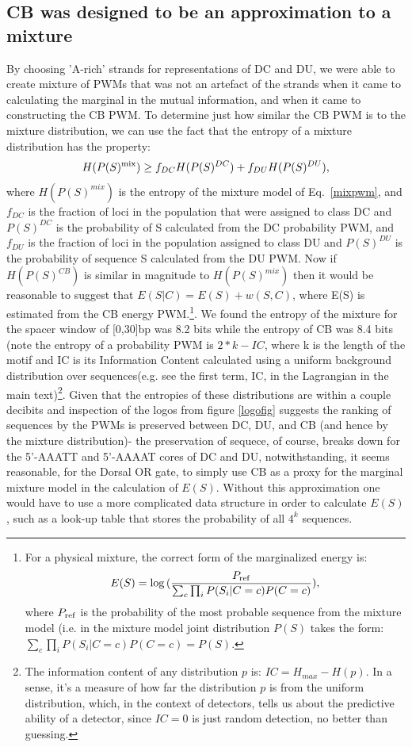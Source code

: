  \subsection{CB was designed to be an approximation to a mixture}\label{just}
By choosing 'A-rich' strands for representations of DC and DU, we were able to create mixture of PWMs that was not an artefact of the strands when it came to calculating the marginal in the mutual information, and when it came to constructing the CB PWM.  To determine just how similar the CB PWM is to the mixture distribution, we can use the fact that the entropy of a mixture distribution has the property:
\begin{equation}
H(P(S)^{\rm mix}) \geq f_{DC} H(P(S)^{DC}) + f_{DU} H(P(S)^{DU}),
\end{equation}
where $H( P(S)^{mix})$ is the entropy of the mixture model of Eq.~\ref{mixpwm}, and $f_{DC}$ is the fraction of loci in the population that were assigned to class DC and $P(S)^{DC}$ is the probability of S calculated from the DC probability PWM, and $f_{DU}$ is the fraction of loci in the population assigned to class DU and $P(S)^{DU}$ is the probability of sequence S calculated from the DU PWM.  Now if $H(P(S)^{CB})$ is similar in magnitude to $H(P(S)^{mix})$ then it would be reasonable to suggest that $E(S|C) =E(S) + w(S,C)$, where E(S) is estimated from the CB energy PWM.\footnote{ For a physical mixture, the correct form of the marginalized energy is: 
\begin{equation}
E(S)=\log{(\frac{P_{\rm{ref}}}{\sum_{c}\prod_i P(S_i|C=c)P(C=c)})},
\end{equation}
where $P_{\rm{ref}}$ is the probability of the most probable sequence from the mixture model (i.e. in the mixture model joint distribution $P(S)$ takes the form: $\sum_{c}\prod_i P(S_i|C=c)P(C=c)= P(S)$.}.  We found the entropy of the mixture for the spacer window of [0,30]bp was 8.2 bits while the entropy of CB was 8.4 bits (note the entropy of a probability PWM is $2*k-IC$, where k is the length of the motif and IC is its Information Content calculated using a uniform background distribution over sequences(e.g. see the first term, IC, in the Lagrangian in the main text)\footnote{The information content of any distribution $p$ is: $IC = H_{max} - H(p)$.  In a sense, it's a measure of how far the distribution $p$ is from the uniform distribution, which, in the context of detectors, tells us about the predictive ability of a detector, since $IC=0$ is just random detection, no better than guessing.}.  Given that the entropies of these distributions are within a couple decibits and inspection of the logos from figure \ref{logofig} suggests the ranking of sequences by the PWMs is preserved between DC, DU, and CB (and hence by the mixture distribution)- the preservation of sequece, of course, breaks down for the 5'-AAATT and 5'-AAAAT cores of DC and DU, notwithstanding, it seems reasonable, for the Dorsal OR gate, to simply use CB as a proxy for the marginal mixture model in the calculation of $E(S)$.  Without this approximation one would have to use a more complicated data structure in order to calculate $E(S)$, such as a look-up table that stores the probability of all $4^k$ sequences. 
 
